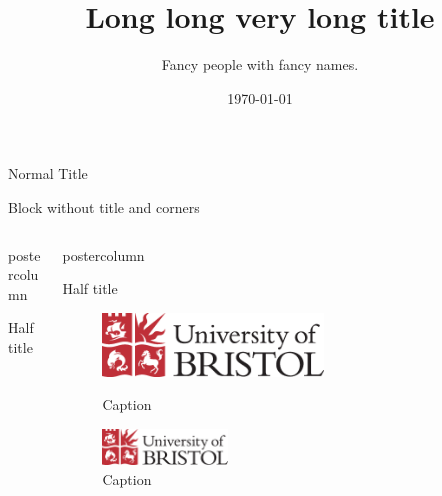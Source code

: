 \documentclass{beamer}
\title{Long long very long title}
\author{Fancy people with fancy names.}
\institute{Fancy institutions with fancy names.}
\date{\today}
\begin{document}
\begin{frame}
	
\vspace{0.8ex}
	
\begin{NRCGblock}{Normal Title}
\blindmathtrue \blindtext
\end{NRCGblock}

\vspace{0.8ex}
\begin{NRCGblock}[colframe=white,no shadow]{}
	Block without title and corners
\end{NRCGblock}	
\vspace{1.0ex}

\begin{columns}[t]
	\begin{column}{.47\textwidth}
		\begin{beamercolorbox}[center,wd=\textwidth]{postercolumn}
			\begin{NRCGblock}[equal height group=A]{Half title}
				\blindtext
			\end{NRCGblock}\vfill
	\end{beamercolorbox}
	\end{column}
	\hspace{12pt}
	\begin{column}{.47\textwidth}
		\begin{beamercolorbox}[center,wd=\textwidth]{postercolumn}
			\begin{NRCGblock}[equal height group=A]{Half title}
				\blindtext
				\begin{figure}
					\begin{minipage}{0.43\textwidth}
						\centering\includegraphics[width=0.6\textwidth]{uob}
						\caption{Caption}
					\end{minipage}
					\begin{minipage}{0.03\textwidth}
					\end{minipage}
					\begin{minipage}{0.45\textwidth}
						\centering\includegraphics[width=0.34\textwidth]{uob}
						\caption{Caption}
					\end{minipage}
				\end{figure}
			\end{NRCGblock}
		\end{beamercolorbox}
	\end{column}
\end{columns}


\end{frame}
\end{document}
